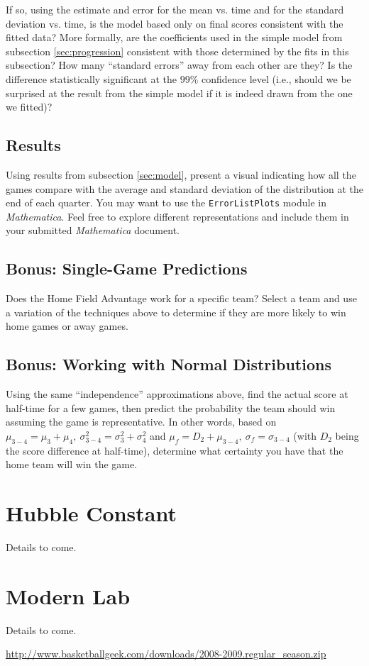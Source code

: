 \documentclass{article}
\begin{document}
If so, using the estimate and error for the mean vs. time and for the standard deviation vs. time,
is the model based only on final scores consistent with the fitted data? More formally, are the coefficients used in the simple model from subsection \ref{sec:progression} consistent
with those determined by the fits in this subsection? How many ``standard errors'' away from each other are they? Is the difference statistically significant at the 
$99\%$ confidence level (i.e., should we be
surprised at the result from the simple model if it is indeed drawn from the one we fitted)?

\subsection{Results}
Using results from subsection \ref{sec:model}, present a visual indicating how all the games compare with the average and standard deviation of the distribution at the end of each quarter. You
may want to use the \texttt{ErrorListPlots} module in \textit{Mathematica}. Feel free to explore different representations and include them in your submitted \textit{Mathematica} document.

\subsection{Bonus: Single-Game Predictions}
Does the Home Field Advantage work for a specific team? Select a team and use a variation of the techniques above to determine if they are more likely to win home games or away games.

\subsection{Bonus: Working with Normal Distributions}
Using the same ``independence'' approximations above, find the actual score at half-time for a few games, then predict the probability the team should win assuming the
game is representative. In other words, based on $\mu_{3-4}=\mu_3+\mu_4,~\sigma_{3-4}^2=\sigma_3^2+\sigma_4^2$ and $\mu_{f}=D_2+\mu_{3-4},~\sigma_f=\sigma_{3-4}$ (with
$D_2$ being the score difference at half-time), determine what certainty you have that the home team will win the game. 

\section{Hubble Constant}
Details to come.

\section{Modern Lab}
Details to come.

\begin{thebibliography}{9}
 \url{http://www.basketballgeek.com/downloads/2008-2009.regular_season.zip}
\end{thebibliography}
\end{document}
